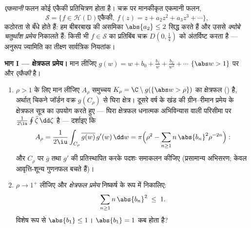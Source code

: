 \begin{problem}\label{pb:b3:conformal:1}
\emph{एकमानी} फलन कोई  एकैकी प्रतिचित्रण होता है। चक्र
पर मानकीकृत एकमानी फलन,
\[
\mathcal S = \bigl\{f \in \mathcal H(\mathbb D) \text{
एकैकी},\ f(z) = z + a_2z^2 + a_3z^3 + \cdots\bigr\},
\]
कठोरता से बँधे होते हैं: हम बीबरबाख की असमिका $\abs{a_2} \leq 2$ सिद्ध करते
हैं और उससे \emph{क्योबे चतुर्थांश प्रमेय} निकालते हैं: किसी भी
$f \in \mathcal S$ का प्रतिबिंब चक्र $D(0, \frac14)$ को अंतर्विष्ट करता है --- अनुरूप
ज्यामिति का तीक्ष्ण सार्वत्रिक नियतांक।

\medskip
\noindent\textbf{भाग I --- क्षेत्रफल प्रमेय।} मान लीजिए $g(w) = w
+ b_0 + \frac{b_1}w + \frac{b_2}{w^2} + \cdots$
$\{\abs w > 1\}$ पर  और \emph{एकैकी} है।
\begin{enumerate}
  \item $\rho > 1$ के लिए मान लीजिए $A_\rho$  समुच्चय $K_\rho = \C\setminus
        g(\{\abs w > \rho\})$ का
        क्षेत्रफल () है, अर्थात् चिकने जॉर्डन वक्र $g(C_\rho)$
        से घिरा क्षेत्र। दूसरे वर्ष के खंड की ग्रीन--रीमान प्रमेय
        के क्षेत्रफल सूत्र का उपयोग करते हुए --- घिरा क्षेत्रफल
        धनात्मक अभिविन्यास वाली परिसीमा पर $\frac1{2\iu}
        \oint\bar\zeta\,\dd\zeta$ है --- दर्शाइए
        कि
        \[
        A_\rho = \frac{1}{2\iu}\int_{C_\rho}
        \overline{g(w)}\,g'(w)\,\dd w
        = \pi\Bigl(\rho^2 -
        \sum_{n\geq1}n\,\abs{b_n}^2\rho^{-2n}\Bigr) :
        \]
        और $C_\rho$ पर $\bar g$ तथा $g'$ की  प्रतिस्थापित
        करके पदशः समाकलन कीजिए (प्रसामान्य अभिसरण; केवल
        आवृत्ति-शून्य गुणनफल बचते हैं)।
  \item $\rho \to 1^+$ लीजिए और \emph{क्षेत्रफल प्रमेय} निष्कर्ष के रूप
        में निकालिए:
        \[
        \sum_{n\geq1}n\,\abs{b_n}^2 \;\leq\; 1 .
        \]
        विशेष रूप से $\abs{b_1} \leq 1$। $\abs{b_1}
        = 1$ कब होता है?
\end{enumerate}


\end{problem}
